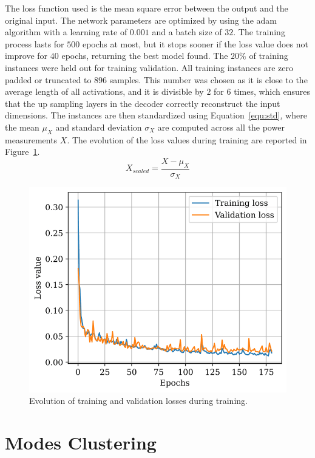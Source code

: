 The loss function used is the mean square error between the output and the original input. The network parameters are optimized by using the \acrfull{adam} algorithm with a learning rate of $0.001$ and a batch size of $32$. The training process lasts for $500$ epochs at most, but it stops sooner if the loss value does not improve for $40$ epochs, returning the best model found. The $20\%$ of training instances were held out for training validation. All training instances are zero padded or truncated to $896$ samples. This number was chosen as it is close to the average length of all activations, and it is divisible by $2$ for $6$ times, which ensures that the up sampling layers in the decoder correctly reconstruct the input dimensions. The instances are then standardized using Equation~\eqref{equ:std}, where the mean $\mu_X$ and standard deviation $\sigma_X$ are computed across all the power measurements $X$. The evolution of the loss values during training are reported in Figure~\ref{fig:autoencoder_losses}.
\begin{equation}\label{equ:std}
    X_{scaled} = \frac{X - \mu_X}{\sigma_X}
\end{equation}

\begin{figure}
    \centering
    \includegraphics[width=.6\linewidth]{images/loss.png}
    \caption{Evolution of training and validation losses during training.}
    \label{fig:autoencoder_losses}
\end{figure}

\section{Modes Clustering}

